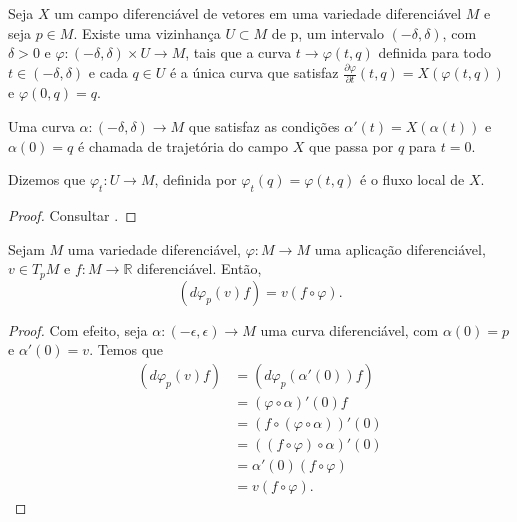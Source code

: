 \begin{theorem}
	\label{teo:equacoes-diferenciais}
	Seja $X$ um campo diferenciável de vetores em uma variedade diferenciável $M$ e seja $p \in M$. Existe uma vizinhança $U\subset M$ de p, um intervalo $(-\delta,\delta)$, com $\delta>0$ e $\varphi:(-\delta, \delta)\times U\to M$, tais que a curva $t \to \varphi(t, q)$ definida para todo $t \in (-\delta, \delta)$ e cada $q \in U$ é a única curva que satisfaz $\frac{\partial \varphi}{\partial t}(t, q)=X(\varphi(t, q))$ e $\varphi(0, q)=q$.

	Uma curva $\alpha:(-\delta, \delta)\to M$ que satisfaz as condições $\alpha'(t)=X(\alpha(t))$ e $\alpha(0)=q$ é chamada de trajetória do campo $X$ que passa por $q$ para $t=0$.

	Dizemos que $\varphi_{t}:U\to M$, definida por $\varphi_{t}(q)=\varphi(t, q)$ é o fluxo local de $X$.
\end{theorem}
\begin{proof}
	Consultar \textcite{leeSmooth2013}.
\end{proof}


\begin{lemma}
	\label{lem:estrela}
	Sejam $M$ uma variedade diferenciável, $\varphi:M\to M$ uma aplicação diferenciável, $v \in T_{p}M$ e $f:M\to \mathbb{R}$ diferenciável. Então,
	\begin{equation*}
		(d\varphi_{p}(v) f)=v(f \circ \varphi).
	\end{equation*}
	\begin{proof}

		Com efeito, seja $\alpha:(-\epsilon, \epsilon)\to M$ uma curva diferenciável, com $\alpha(0)=p$ e $\alpha'(0)=v$. Temos que
		\begin{align*}
			(d\varphi_{p}(v)f) & =(d\varphi_{p}(\alpha'(0))f)          \\
			                   & =(\varphi \circ \alpha)'(0)f          \\
			                   & =(f \circ (\varphi \circ \alpha))'(0) \\
			                   & =((f \circ \varphi) \circ \alpha)'(0) \\
			                   & =\alpha'(0)(f \circ \varphi)          \\
			                   & =v(f \circ \varphi).
		\end{align*}
	\end{proof}
\end{lemma}



